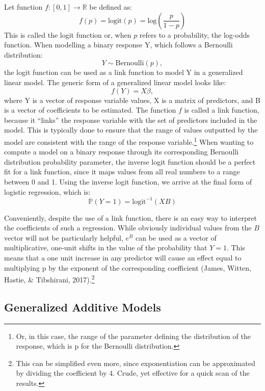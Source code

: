 \documentclass[12pt,twoside]{reedthesis}
\begin{document}
  Let function \(f : [0, 1] \to \mathbb{R}\) be defined as:
  \[f(p) = \text{logit}(p) = \text{log}\left( \frac{p}{1-p} \right)\] This
  is called the logit function or, when \(p\) refers to a probability, the
  log-odds function. When modelling a binary response Y, which follows a
  Bernoulli distribution: \[Y \sim \text{Bernoulli}(p),\] the logit
  function can be used as a link function to model Y in a generalized
  linear model. The generic form of a generalized linear model looks
  like:\\
  \[f(Y) = X\beta ,\] where Y is a vector of response variable values, X
  is a matrix of predictors, and B is a vector of coefficients to be
  estimated. The function \(f\) is called a link function, because it
  ``links'' the response variable with the set of predictors included in
  the model. This is typically done to ensure that the range of values
  outputted by the model are consistent with the range of the response
  variable.\footnote{Or, in this case, the range of the parameter defining
    the distribution of the response, which is p for the Bernoulli
    distribution.} When wanting to compute a model on a binary response
  through its corresponding Bernoulli distribution probability parameter,
  the inverse logit function should be a perfect fit for a link function,
  since it maps values from all real numbers to a range between 0 and 1.
  Using the inverse logit function, we arrive at the final form of
  logistic regression, which is:\\
  \[\mathbb{P} (Y = 1) = \text{logit}^{-1} (XB)\]
  
  Conveniently, despite the use of a link function, there is an easy way
  to interpret the coefficients of such a regression. While obviously
  individual values from the \(B\) vector will not be particularly
  helpful, \(e^B\) can be used as a vector of multiplicative, one-unit
  shifts in the value of the probability that \(Y = 1\). This means that a
  one unit increase in any predictor will cause an effect equal to
  multiplying p by the exponent of the corresponding coefficient (James,
  Witten, Hastie, \& Tibshirani, 2017).\footnote{This can be simplified
    even more, since exponentiation can be approximated by dividing the
    coefficient by 4. Crude, yet effective for a quick scan of the
    results.}
  
  \subsection{Generalized Additive
  Models}\label{generalized-additive-models}
  
\end{document}
